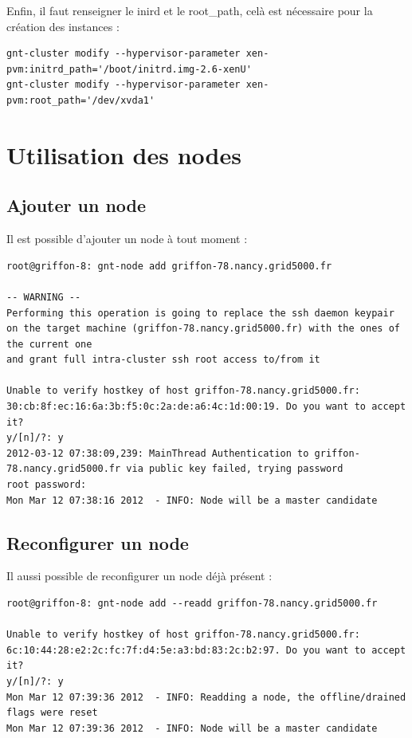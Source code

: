 Enfin, il faut renseigner le inird et le root\_path, celà est nécessaire pour la création des instances :
\begin{lstlisting}
gnt-cluster modify --hypervisor-parameter xen-pvm:initrd_path='/boot/initrd.img-2.6-xenU'
gnt-cluster modify --hypervisor-parameter xen-pvm:root_path='/dev/xvda1'
\end{lstlisting}  

\section {Utilisation des nodes}
\subsection {Ajouter un node}
Il est possible d'ajouter un node à tout moment :
\begin{lstlisting}
root@griffon-8: gnt-node add griffon-78.nancy.grid5000.fr

-- WARNING -- 
Performing this operation is going to replace the ssh daemon keypair
on the target machine (griffon-78.nancy.grid5000.fr) with the ones of the current one
and grant full intra-cluster ssh root access to/from it

Unable to verify hostkey of host griffon-78.nancy.grid5000.fr:
30:cb:8f:ec:16:6a:3b:f5:0c:2a:de:a6:4c:1d:00:19. Do you want to accept
it?
y/[n]/?: y
2012-03-12 07:38:09,239: MainThread Authentication to griffon-78.nancy.grid5000.fr via public key failed, trying password
root password:
Mon Mar 12 07:38:16 2012  - INFO: Node will be a master candidate
\end{lstlisting}
\subsection{Reconfigurer un node}
Il aussi possible de reconfigurer un node déjà présent :
\begin{lstlisting}
root@griffon-8: gnt-node add --readd griffon-78.nancy.grid5000.fr

Unable to verify hostkey of host griffon-78.nancy.grid5000.fr:
6c:10:44:28:e2:2c:fc:7f:d4:5e:a3:bd:83:2c:b2:97. Do you want to accept
it?
y/[n]/?: y
Mon Mar 12 07:39:36 2012  - INFO: Readding a node, the offline/drained flags were reset
Mon Mar 12 07:39:36 2012  - INFO: Node will be a master candidate
\end{lstlisting}


